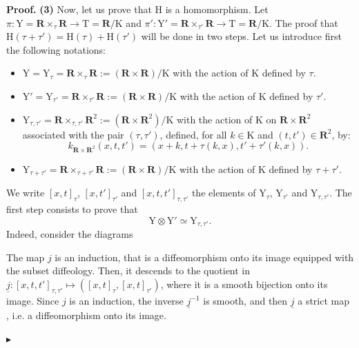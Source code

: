 \documentclass[10pt,letterpaper,reqno]{amsart}
\theoremstyle{article}
\renewenvironment{proof}{\noindent \textbf{Proof.}} {\nolinebreak $\blacktriangleright$}
\newcommand{\1}{{\hat 1}}
\newcommand{\0}{{\hat 0}}
\newcommand{\RR}{\mathbf R}
\def \H{\mathrm H}
\def \K{\mathrm K}
\def \T{\mathrm T}
\def \Y{\mathrm Y}
\newcommand{\cl}[1]{\left[ #1 \right]}
\newcommand{\Ka}{\K}
\def \H{\mathrm H}
\begin{document}
\begin{proof}
    \textbf{(3)} Now,
    let us prove that $\H$ is a homomorphism.
    Let $\pi : \Y = \RR \times_\tau \RR \to \T = \RR/\Ka$ and $\pi' : \Y' = \RR \times_{\tau'} \RR \to \T = \RR/\Ka$.
    The proof that $\H(\tau + \tau') = \H(\tau) + \H(\tau')$ will be done in two steps.
    Let us introduce first the following notations:
    \begin{itemize}
      \item $\Y = \Y_\tau = \RR \times_\tau \RR := (\RR \times \RR)/\Ka$ with the action of $\Ka$ defined by $\tau$.
      \item $\Y' = \Y_{\tau'} = \RR \times_{\tau'} \RR := (\RR \times \RR)/\Ka$ with the action of $\Ka$ defined by $\tau'$.
      \item $\Y_{\tau,\tau'} = \RR \times_{\tau,\tau'} \RR^2 := (\RR \times \RR^2)/\Ka$ with the action of $\Ka$ on $\RR \times \RR^2$ associated with the pair $(\tau,\tau')$,
      defined,
      for all $k\in \Ka$ and $(t,t') \in \RR^2$,
      by:
      $$
        k_{\RR \times \RR^2}(x,t,t') = (x + k,t + \tau(k,x),t'+ \tau'(k,x)).
        $$
      \item $\Y_{\tau + \tau'} = \RR \times_{\tau + \tau'} \RR := (\RR \times \RR)/\Ka$ with the action of $\Ka$ defined by $\tau + \tau'$.
    \end{itemize}
    We write $[x,t]_{\tau}$,
    $[x,t']_{\tau'}$ and $[x,t,t']_{\tau,\tau'}$ the elements of $\Y_{\tau}$,
    $\Y_{\tau'}$ and $\Y_{\tau,\tau'}$.
    The first step consists to prove that
    $$
      \Y \otimes \Y' \simeq \Y_{\tau,\tau'}.
      $$
    Indeed,
    consider the diagrams
    \begin{center}
    \end{center}
    The map $j$ is an induction,
    that is a diffeomorphism onto its image equipped with the subset diffeology.
    Then,
    it descends to the quotient in $\underline j : \cl{x,t,t'}_{\tau,\tau'} \mapsto (\cl{x,t}_\tau, \cl{x,t}_{\tau'})$,
    where it is a smooth bijection onto its image.
    Since $j$ is an induction,
    the inverse ${\underline j}^{-1}$ is smooth,
    and then $\underline j$ a strict map \cite[]{PIZ13},
    i.e. a diffeomorphism onto its image.
    

\end{proof}
\end{document}
